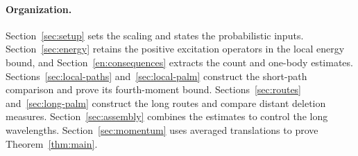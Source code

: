 \paragraph{Organization.}
Section~\ref{sec:setup} sets the scaling and states the probabilistic
inputs. Section~\ref{sec:energy} retains the positive excitation operators
in the local energy bound, and Section~\ref{en:consequences} extracts
the count and one-body estimates.
Sections~\ref{sec:local-paths} and~\ref{sec:local-palm}
construct the short-path comparison and prove its fourth-moment bound.
Sections~\ref{sec:routes} and~\ref{sec:long-palm} construct the long routes
and compare distant deletion measures. Section~\ref{sec:assembly}
combines the estimates to control the long wavelengths.
Section~\ref{sec:momentum} uses averaged translations to prove
Theorem~\ref{thm:main}.
